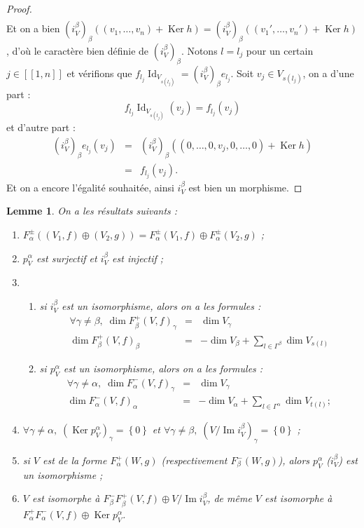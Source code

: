 \documentclass[a4paper,10pt]{article}
\newtheorem{lm}{Lemme}[section]
\DeclareMathOperator{\Ker}{Ker}
\DeclareMathOperator{\Id}{Id}
\DeclareMathOperator{\Img}{Im}
\begin{document}
\begin{proof}
\[\begin{array}{rll}
\end{array}
\]
Et on a bien $(i_{V}^{\beta})_{\beta}((v_{1},\dots,v_{n})+\Ker h)=(i_{V}^{\beta})_{\beta}((v_{1}',\dots,v_{n}')+\Ker h)
$, d'où le caractère bien définie de $(i_{V}^{\beta})_{\beta}$. Notons $l=l_{j}$ pour un certain $j\in[\![1,n]\!]$ et vérifions que $f_{l_{j}}\Id_{V_{s(l_{j})}}=(i_{V}^{\beta})_{\beta}e_{l_{j}}$. Soit $v_{j}\in V_{s(l_{j})}$, on a d'une part :
\[
	f_{l_{j}}\Id_{V_{s(l_{j})}}(v_{j})=f_{l_{j}}(v_{j})
\]
et d'autre part :
\[
\begin{array}{rll}
	(i_{V}^{\beta})_{\beta}e_{l_{j}}(v_{j})&=& (i_{V}^{\beta})_{\beta}((0,\dots,0,v_{j},0,\dots,0)+\Ker h)\\
	&=& f_{l_{j}}(v_{j}).
\end{array}
\]
Et on a encore l'égalité souhaitée, ainsi $i_{V}^{\beta}$ est bien un morphisme.
\end{proof}
\begin{lm}
	On a les résultats suivants :
	\begin{enumerate}
		\item $F_{\alpha}^{\pm}((V_{1},f)\oplus (V_{2},g))=F_{\alpha}^{\pm}(V_{1},f)\oplus F_{\alpha}^{\pm}(V_{2},g)$ ;
		\item $p_{V}^{\alpha}$ est surjectif et $i_{V}^{\beta}$ est injectif ;
		\item \begin{enumerate}
				\item si $i_{V}^{\beta}$ est un isomorphisme, alors on a les formules :
					\[
\begin{array}{rll}
	\forall\gamma\neq\beta,\;\dim F_{\beta}^{+}(V,f)_{\gamma}&=& \dim V_{\gamma}\\
	\dim F_{\beta}^{+}(V,f)_{\beta}&=& -\dim V_{\beta}+\sum_{l\in\Gamma^{\beta}}\dim V_{s(l)}
\end{array}
					\]
				\item si $p_{V}^{\alpha}$ est un isomorphisme, alors on a les formules :
	\[
\begin{array}{rll}
	\forall\gamma\neq\alpha,\;\dim F_{\alpha}^{-}(V,f)_{\gamma}&=& \dim V_{\gamma}\\
	\dim F_{\alpha}^{-}(V,f)_{\alpha}&=& -\dim V_{\alpha}+\sum_{l\in\Gamma^{\alpha}}\dim V_{t(l)};
\end{array}
					\]
			\end{enumerate}
		\item $\forall \gamma\neq\alpha,\;(\Ker p_{V}^{\alpha})_{\gamma}=\left\{ 0 \right\}$ et $\forall \gamma\neq\beta,\;(V/\Img i_{V}^{\beta})_{\gamma}=\left\{ 0 \right\}$ ;
		\item si $V$ est de la forme $F_{\alpha}^{+}(W,g)$ (respectivement $F_{\beta}^{-}(W,g)$), alors $p_{V}^{\alpha}$ ($i_{V}^{\beta}$) est un isomorphisme ;
		\item $V$ est isomorphe à $F_{\beta}^{-}F_{\beta}^{+}(V,f)\oplus V/\Img i_{V}^{\beta}$, de même $V$ est isomorphe à $F_{\alpha}^{+}F_{\alpha}^{-}(V,f)\oplus \Ker p_{V}^{\alpha}$.
	\end{enumerate}
\end{lm}
\end{document}
